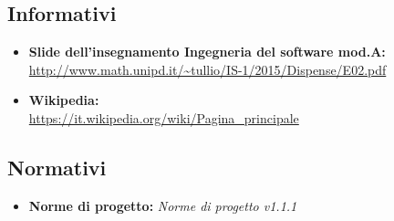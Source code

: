\documentclass[a4paper]{report}
\begin{document}
	\subsection{Informativi}	
		\begin{itemize}
			\item \textbf{Slide dell'insegnamento Ingegneria del software mod.A:} \\
			\url{http://www.math.unipd.it/~tullio/IS-1/2015/Dispense/E02.pdf}
			\item \textbf{Wikipedia:} \\
			\url{https://it.wikipedia.org/wiki/Pagina_principale}
		\end{itemize}
	\subsection{Normativi}
		\begin{itemize}
			\item \textbf{Norme di progetto:} \emph{Norme di progetto v1.1.1}
		\end{itemize}
		
\end{document}
